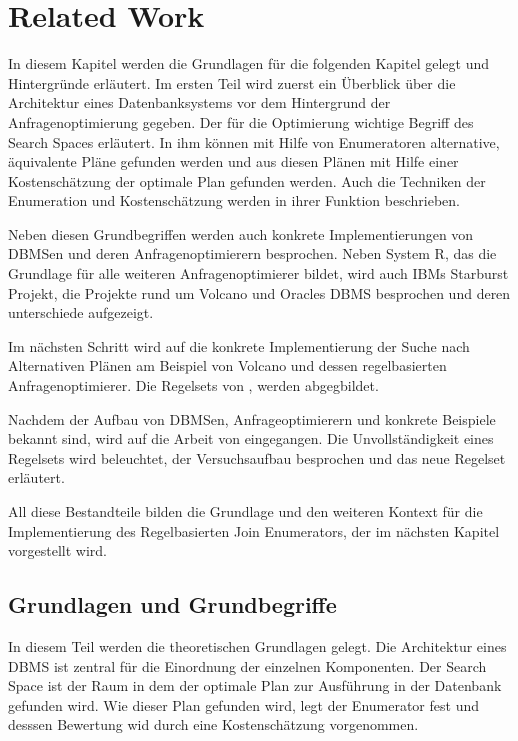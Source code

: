 \chapter{Related Work}


In diesem Kapitel werden die Grundlagen für die folgenden Kapitel gelegt und Hintergründe erläutert. Im ersten Teil wird zuerst ein Überblick über die Architektur eines Datenbanksystems vor dem Hintergrund der Anfragenoptimierung gegeben. Der für die Optimierung wichtige Begriff des Search Spaces erläutert. In ihm können mit Hilfe von Enumeratoren alternative, äquivalente Pläne gefunden werden und aus diesen Plänen mit Hilfe einer Kostenschätzung der optimale Plan gefunden werden. Auch die Techniken der Enumeration und Kostenschätzung werden in ihrer Funktion beschrieben.

Neben diesen Grundbegriffen werden auch konkrete Implementierungen von DBMSen und deren Anfragenoptimierern besprochen. Neben System R, das die Grundlage für alle weiteren Anfragenoptimierer bildet, wird auch IBMs Starburst Projekt, die Projekte rund um Volcano und Oracles DBMS besprochen und deren unterschiede aufgezeigt.

Im nächsten Schritt wird auf die konkrete Implementierung der Suche nach Alternativen Plänen am Beispiel von Volcano und dessen regelbasierten Anfragenoptimierer. Die Regelsets von \cite{pellenkoft1997complexity}, \cite{pellenkoft1997duplicate} werden abgegbildet.

Nachdem der Aufbau von DBMSen, Anfrageoptimierern und konkrete Beispiele bekannt sind, wird auf die Arbeit von \cite{indien} eingegangen. Die Unvollständigkeit eines Regelsets wird beleuchtet, der Versuchsaufbau besprochen und das neue Regelset erläutert.

All diese Bestandteile bilden die Grundlage und den weiteren Kontext für die Implementierung des Regelbasierten Join Enumerators, der im nächsten Kapitel vorgestellt wird.






\section{Grundlagen und Grundbegriffe}

In diesem Teil werden die theoretischen Grundlagen gelegt. Die Architektur eines DBMS ist zentral für die Einordnung der einzelnen Komponenten. Der Search Space ist der Raum in dem der optimale Plan zur Ausführung in der Datenbank gefunden wird. Wie dieser Plan gefunden wird, legt der Enumerator fest und desssen Bewertung wid durch eine Kostenschätzung vorgenommen.














